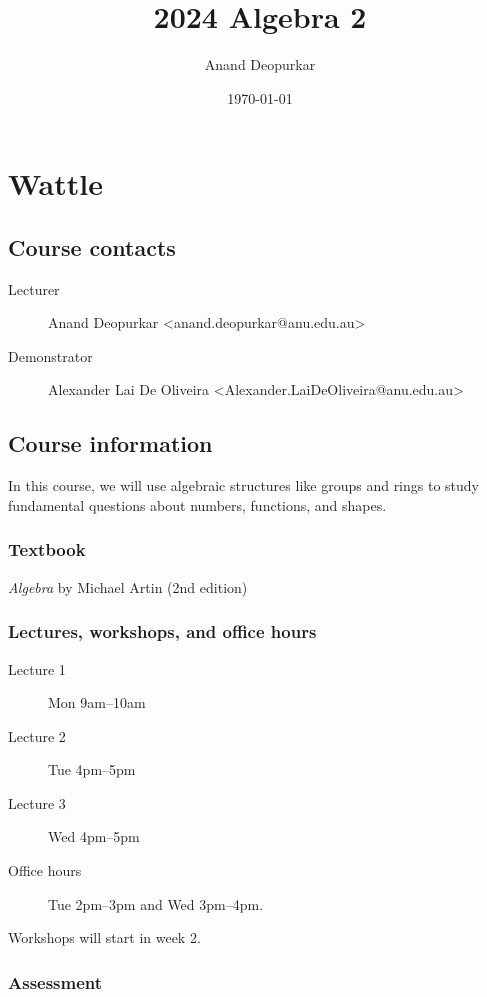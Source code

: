 \documentclass[11pt]{article}
\author{Anand Deopurkar}
\date{\today}
\title{2024 Algebra 2}
\begin{document}
\maketitle
\section{Wattle}
\label{sec:org41ac763}
\subsection{Course contacts}
\label{sec:org085d460}

\begin{description}
\item[{Lecturer}] Anand Deopurkar <anand.deopurkar@anu.edu.au>
\item[{Demonstrator}] Alexander Lai De Oliveira <Alexander.LaiDeOliveira@anu.edu.au>
\end{description}
\subsection{Course information}
\label{sec:orgb2f2c01}

In this course, we will use algebraic structures like groups and rings to study fundamental questions about numbers, functions, and shapes.
\subsubsection{Textbook}
\label{sec:org2465d65}

\emph{Algebra} by Michael Artin (2nd edition)
\subsubsection{Lectures, workshops, and office hours}
\label{sec:orgafa83d0}

\begin{description}
\item[{Lecture 1}] Mon 9am--10am
\item[{Lecture 2}] Tue 4pm--5pm
\item[{Lecture 3}] Wed 4pm--5pm

\item[{Office hours}] Tue 2pm--3pm and Wed 3pm--4pm.
\end{description}

Workshops will start in week 2.
\subsubsection{Assessment}
\label{sec:org80717b6}
\end{document}
